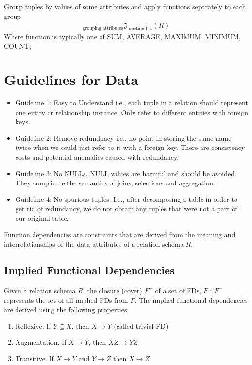 \documentclass[a4paper]{article}
\theoremstyle{plain}
\theoremstyle{definition}
\newtheorem{defn}{Definition}[section]
\theoremstyle{remark}
\begin{document}
\begin{tcolorbox}[colback=black!3!white,colframe=black!60!white,title=\begin{defn}Aggregate Function \label{Aggregate Function}\end{defn}]
Group tuples by values of some attributes and apply functions separately to each group
\begin{align}
{}_{\text{grouping attributes}}\mathfrak{J}_{\text{function list}}(R)
\end{align}
Where function is typically one of SUM, AVERAGE, MAXIMUM, MINIMUM, COUNT;
\end{tcolorbox}
\section{Guidelines for Data}
\begin{itemize}
	\item Guideline 1: Easy to Understand i.e., each tuple in a relation should represent one entity or relationship instance. Only refer to different entities with foreign keys.
	\item Guideline 2: Remove redundancy i.e., no point in storing the same name twice when we could just refer to it with a foreign key. There are consistency costs and potential anomalies caused with redundancy.
	\item Guideline 3: No NULLs. NULL values are harmful and should be avoided. They complicate the semantics of joins, selections and aggregation.
	\item Guideline 4: No spurious tuples. I.e., after decomposing a table in order to get rid of redundancy, we do not obtain any tuples that were not a part of our original table.
\end{itemize}
Function dependencies are constraints that are derived from the meaning and interrelationships of the data attributes of a relation schema $R$.
\subsection{Implied Functional Dependencies}
Given a relation schema $R$, the closure (cover) $F^{+}$ of a set of FDs,  $F$ : $F^{+}$ represents the set of all implied FDs from $F$. The implied functional dependencies are derived using the following properties:
\begin{tcolorbox}[colback=black!3!white,colframe=black!60!white,title=\begin{defn}Armstrong Axioms \label{Armstrong Axioms}\end{defn}]
\begin{enumerate}
	\item Reflexive. If $Y \subseteq X$, then $X\to Y$ (called trivial FD)
	\item Augmentation. If $X\to Y$, then $XZ \to YZ$ 
	\item Transitive. If  $X\to Y$ and $Y\to Z$ then $X\to Z$
\end{enumerate}
\end{tcolorbox}
\end{document}
